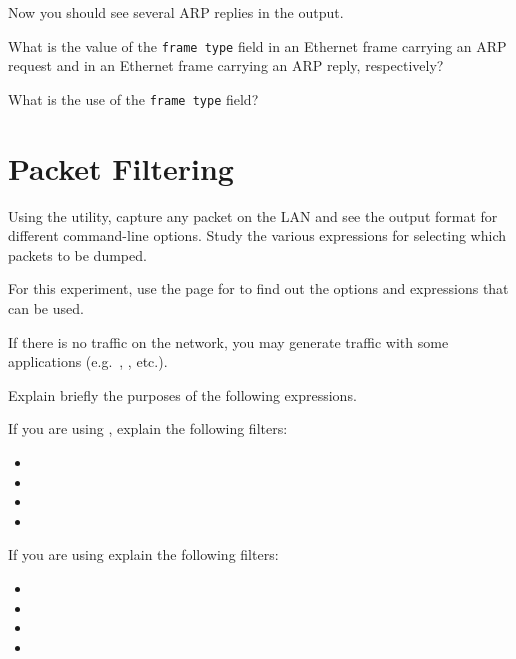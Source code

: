 \documentclass{../UTNetLab}
\begin{document}
    Now you should see several ARP replies in the  output.
    
    \begin{report}
        \item What is the value of the \texttt{frame type} field in an Ethernet frame carrying an ARP request and in an Ethernet frame carrying an ARP reply, respectively?

        \item What is the use of the \texttt{frame type} field?
    \end{report}

\section{Packet Filtering}
    Using the  utility, capture any packet on the LAN and see the output format
    for different command-line options.
    Study the various expressions for selecting
    which packets to be dumped.

    For this experiment, use the  page for  to find out the options and
    expressions that can be used.

    If there is no traffic on the network, you may generate traffic with some applications
    (e.g.\ , , etc.).
    
    \begin{report}
        \item Explain briefly the purposes of the following  expressions.
    \end{report}

    If you are using , explain the following filters:
    \begin{itemize}
        \item {}
        \item {}
        \item {}
        \item {}
    \end{itemize}
    
    If you are using  explain the following filters:
    \begin{itemize}
        \item {}
        \item {}
        \item {}
        \item {}
    \end{itemize}
\end{document}
